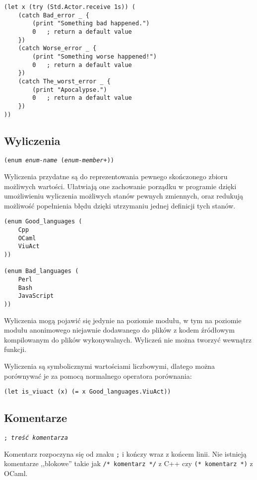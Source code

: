 \begin{lstlisting}
(let x (try (Std.Actor.receive 1s)) (
    (catch Bad_error _ {
        (print "Something bad happened.")
        0   ; return a default value
    })
    (catch Worse_error _ {
        (print "Something worse happened!")
        0   ; return a default value
    })
    (catch The_worst_error _ {
        (print "Apocalypse.")
        0   ; return a default value
    })
))
\end{lstlisting}

\subsection{Wyliczenia}

\texttt{(enum \emph{enum-name} (\emph{enum-member}+))}
\newline

Wyliczenia przydatne są do reprezentowania pewnego skończonego zbioru możliwych wartości. Ułatwiają one
zachowanie porządku w programie dzięki umożliwieniu wyliczenia możliwych stanów pewnych zmiennych, oraz
redukują możliwość popełnienia błędu dzięki utrzymaniu jednej definicji tych stanów.

\begin{lstlisting}
(enum Good_languages (
    Cpp
    OCaml
    ViuAct
))

(enum Bad_languages (
    Perl
    Bash
    JavaScript
))
\end{lstlisting}

Wyliczenia mogą pojawić się jedynie na poziomie modułu, w tym na poziomie modułu anonimowego niejawnie
dodawanego do plików z kodem źródłowym kompilowanym do plików wykonywalnych. Wyliczeń nie można tworzyć
wewnątrz funkcji.

Wyliczenia są symbolicznymi wartościami liczbowymi, dlatego można porównywać je
za pomocą normalnego operatora porównania:

\begin{lstlisting}
(let is_viuact (x) (= x Good_languages.ViuAct))
\end{lstlisting}

\subsection{Komentarze}

\texttt{; \emph{treść komentarza}}
\newline

Komentarz rozpoczyna się od znaku \texttt{;} i kończy wraz z końcem linii.
Nie istnieją komentarze ,,blokowe'' takie jak \texttt{/* komentarz */} z C++ czy
\texttt{(* komentarz *)} z OCaml.

